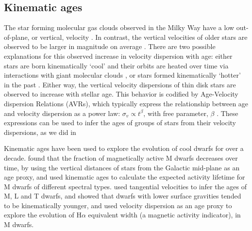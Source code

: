 \subsection{Kinematic ages}

The star forming molecular gas clouds observed in the Milky Way have a low
out-of-plane, or vertical, velocity \citep[\eg][]{stark1989, stark2005,
aumer2009, martig2014, aumer2016}.
In contrast, the vertical velocities of older stars are observed to be larger
in magnitude on average \citep{stromberg1946, wielen1977, nordstrom2004,
holmberg2007, holmberg2009, aumer2009, casagrande2011, ting2019, yu2018}.
There are two possible explanations for this observed increase in velocity
dispersion with age: either stars are born kinematically `cool' and their
orbits are heated over time via interactions with giant molecular clouds
\citep[see][for a review of secular evolution in the MW]{sellwood2014}, or
stars formed kinematically `hotter' in the past \citep[\eg][]{bird2013}.
Either way, the vertical velocity dispersions of thin disk stars are observed
to increase with stellar age.
This behavior is codified by Age-Velocity dispersion Relations (AVRs), which
typically express the relationship between age and velocity dispersion as a
power law: $\sigma_v \propto t^\beta$, with free parameter, $\beta$
\citep[\eg][]{holmberg2009, yu2018}.
These expressions can be used to infer the ages of groups of stars from their
velocity dispersions, as we did in \citet{lu2021}

Kinematic ages have been used to explore the evolution of cool dwarfs for over
a decade.
\citet{west2004, west2006} found that the fraction of magnetically active M
dwarfs decreases over time, by using the vertical distances of stars from the
Galactic mid-plane as an age proxy, and \citet{west2008} used kinematic ages
to calculate the expected activity lifetime for M dwarfs of different spectral
types.
\citet{faherty2009} used tangential velocities to infer the ages of M, L and T
dwarfs, and showed that dwarfs with lower surface gravities tended to be
kinematically younger, and \citet{kiman2019} used velocity dispersion as an
age proxy to explore the evolution of H$\alpha$ equivalent width (a magnetic
activity indicator), in M dwarfs.


